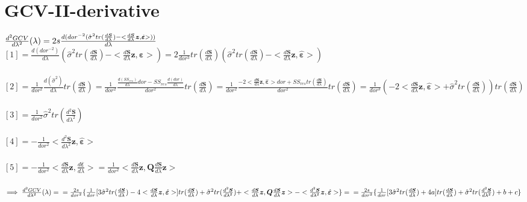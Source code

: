 \documentclass[11pt,twoside]{report}
\begin{document}
\section{GCV-II-derivative}
$ \frac{d^2GCV}{d\lambda^2}(\lambda) = 2s\frac{d({dor}^{-2}(\hat{\sigma}^2tr(\frac{d\mathbold{S}}{d\lambda}) - <\frac{d\mathbold{S}}{d\lambda}\mathbold{z}, \hat{\mathbold{\varepsilon}}>))}{d\lambda}\\$
\\
$ [1] = \frac{d(dor^{-2})}{d\lambda}(\hat{\sigma}^2tr(\frac{d\mathbold{S}}{d\lambda}) - <\frac{d\mathbold{S}}{d\lambda}\mathbold{z}, \hat{\mathbold{\varepsilon}}>) =  2\frac{1}{dor^3}tr(\frac{d\mathbold{S}}{d\lambda})(\hat{\sigma}^2tr(\frac{d\mathbold{S}}{d\lambda}) - <\frac{d\mathbold{S}}{d\lambda}\mathbold{z}, \hat{\mathbold{\varepsilon}}>)$\\
\\
$ [2] = \frac{1}{dor^2}\frac{d(\hat{\sigma}^2)}{d\lambda}tr(\frac{d\mathbold{S}}{d\lambda}) = \frac{1}{dor^2}\frac{\frac{d(SS_{res})}{d\lambda}dor - SS_{res}\frac{d(dor)}{d\lambda}}{dor^2}tr(\frac{d\mathbold{S}}{d\lambda}) = \frac{1}{dor^2}\frac{-2<\frac{d\mathbold{S}}{d\lambda}\mathbold{z}, \hat{\mathbold{\varepsilon}}>dor + SS_{res}tr(\frac{d\mathbold{S}}{d\lambda})}{dor^2}tr(\frac{d\mathbold{S}}{d\lambda}) = \frac{1}{dor^3}(-2<\frac{d\mathbold{S}}{d\lambda}\mathbold{z}, \hat{\mathbold{\varepsilon}}> + \hat{\sigma}^2tr(\frac{d\mathbold{S}}{d\lambda}))tr(\frac{d\mathbold{S}}{d\lambda})$\\
\\
$ [3] =  \frac{1}{dor^2}\hat{\sigma}^2tr(\frac{d^2\mathbold{S}}{d\lambda^2})$\\
\\
$ [4] = - \frac{1}{dor^2}<\frac{d^2\mathbold{S}}{d\lambda^2}\mathbold{z}, \hat{\mathbold{\varepsilon}}>$\\
\\
$ [5] = - \frac{1}{dor^2}<\frac{d\mathbold{S}}{d\lambda}\mathbold{z}, \frac{d\hat{\mathbold{\varepsilon}}}{d\lambda}> = \frac{1}{dor^2}<\frac{d\mathbold{S}}{d\lambda}\mathbold{z},\mathbold{Q} \frac{d\mathbold{S}}{d\lambda}\mathbold{z}>$\\
\\
$\implies  \frac{d^2GCV}{d\lambda^2}(\lambda) =
\\ =\frac{2s}{dor^2}\{\frac{1}{dor}[3\hat{\sigma}^2tr(\frac{d\mathbold{S}}{d\lambda}) - 4<\frac{d\mathbold{S}}{d\lambda}\mathbold{z}, \hat{\mathbold{\varepsilon}}>]tr(\frac{d\mathbold{S}}{d\lambda}) + \hat{\sigma}^2tr(\frac{d^2\mathbold{S}}{d\lambda^2}) + <\frac{d\mathbold{S}}{d\lambda}\mathbold{z},\mathbold{Q} \frac{d\mathbold{S}}{d\lambda}\mathbold{z}> - <\frac{d^2\mathbold{S}}{d\lambda^2}\mathbold{z}, \hat{\mathbold{\varepsilon}}>\} = \\
=\frac{2s}{dor^2}\{\frac{1}{dor}[3\hat{\sigma}^2tr(\frac{d\mathbold{S}}{d\lambda}) + 4a]tr(\frac{d\mathbold{S}}{d\lambda}) + \hat{\sigma}^2tr(\frac{d^2\mathbold{S}}{d\lambda^2}) +b+c\}$
\end{document}
